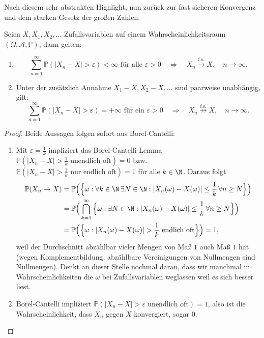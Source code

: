 Nach diesem sehr abstrakten Highlight, nun zur\"uck zur fast sicheren Konvergenz und dem starken Gesetz der gro\ss en Zahlen. 
\begin{korollar}\label{ko}
	Seien $X, X_1, X_2, ...$ Zufallsvariablen auf einem Wahrscheinlichkeitsraum $(\Omega, \mathcal A, \mathbb P)$, dann gelten:
	\begin{enumerate}[label=(\roman*)]
		\item $$\sum_{n=1}^\infty \mathbb P(|X_n-X|>\varepsilon)<\infty\text{  f\"ur alle }\varepsilon>0 \quad\Longrightarrow\quad X_n\overset{\text{f.s.}}{\to}X,\quad n\to\infty.$$
		\item Unter der zus\"atzlich Annahme $X_1-X, X_2-X, ...$ sind paarweise unabh\"angig, gilt: $$\sum_{n=1}^\infty \mathbb P(|X_n-X|>\varepsilon)=+\infty\text{ f\"ur ein }\varepsilon>0\quad \Longrightarrow\quad X_n\overset{\text{f.s.}}{\not\to}X, \quad n\to\infty.$$
	\end{enumerate}
\end{korollar}
\begin{proof}
	Beide Aussagen folgen sofort aus Borel-Cantelli:
\begin{enumerate}[label=(\roman*)]
\item Mit $\varepsilon=\frac 1 k$ impliziert das Borel-Cantelli-Lemma $\mathbb P(|X_n-X|>\frac 1 k\text{ unendlich oft})=0$ bzw. $\mathbb P(|X_n-X|>\frac 1 k\text{ nur endlich oft})=1$ f\"ur alle $k\in\N$. Daraus folgt
	\begin{align*}
		\mathbb P(X_n\to X)&=\mathbb P\Big(\Big\{\omega: \forall k \in \N\, \exists N\in \N: |X_n(\omega)-X(\omega)|\leq \frac{1}{k}\, \forall n\geq N\Big\}\Big)\\
		&=\mathbb P\Big(\bigcap_{k=1}^\infty \Big\{\omega:  \exists N\in \N: |X_n(\omega)-X(\omega)|\leq \frac{1}{k}\, \forall n\geq N\Big\}\Big)\\
		&=\mathbb P\Big(  \Big\{\omega: |X_n(\omega)-X(\omega)|>\frac{1}{k}\text{ endlich oft}\Big\}\Big)=1,
	\end{align*}
	weil der Durchschnitt abz\"ahlbar vieler Mengen von Ma\ss{} $1$ auch Ma\ss{} $1$ hat (wegen Komplementbildung, abz\"ahlbare Vereinigungen von Nullmengen sind Nullmengen). Denkt an dieser Stelle nochmal daran, dass wir manchmal in Wahrscheinlichkeiten die $\omega$ bei Zufallsvariablen weglassen weil es sich besser liest.	
\item Borel-Cantelli impliziert $\mathbb P(|X_n-X|>\varepsilon\text{ unendlich oft})=1$, also ist die Wahrscheinlichkeit, dass $X_n$ gegen $X$ konvergiert, sogar $0$.
\end{enumerate}
\end{proof}

